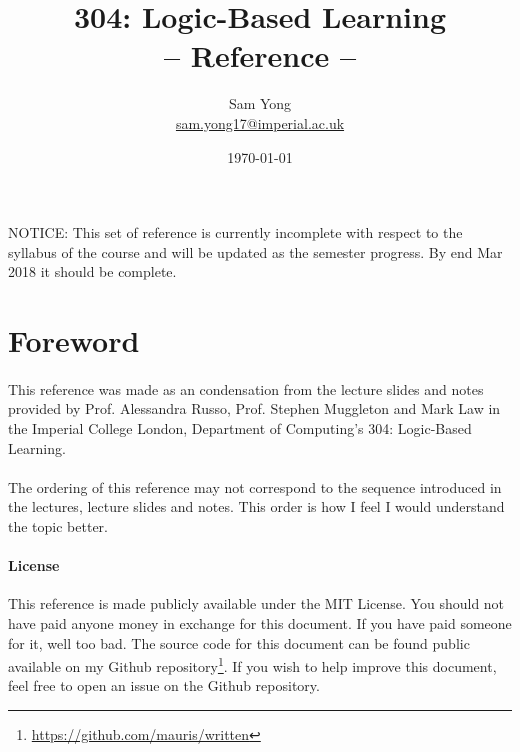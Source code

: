 \documentclass{article}
\title{
	 \huge 304: Logic-Based Learning\\
	 \huge -- Reference --
}
\date{\today}
\author{
	Sam Yong \\
	\small \href{mailto:sam.yong17@imperial.ac.uk}{sam.yong17@imperial.ac.uk}
}
\theoremstyle{plain}
\theoremstyle{definition}
\begin{document}
\maketitle

\begin{multicols}{2}

\paragraph{} NOTICE: This set of reference is currently incomplete with respect to the syllabus of the course and will be updated as the semester progress. By end Mar 2018 it should be complete.

\section*{Foreword}  

\paragraph{} This reference was made as an condensation from the lecture slides and notes provided by Prof. Alessandra Russo, Prof. Stephen Muggleton and Mark Law in the Imperial College London, Department of Computing's 304: Logic-Based Learning.

\paragraph{} The ordering of this reference may not correspond to the sequence introduced in the lectures, lecture slides and notes. This order is how I feel I would understand the topic better.

\begin{footnotesize}
\paragraph{License} This reference is made publicly available under the MIT License. You should not have paid anyone money in exchange for this document. If you have paid someone for it, well too bad. The source code for this document can be found public available on my Github repository\footnote{\href{https://github.com/mauris/written}{https://github.com/mauris/written}}. If you wish to help improve this document, feel free to open an issue on the Github repository.
\end{footnotesize}

\newpage
\tableofcontents
\newpage


\end{multicols}
\end{document}
